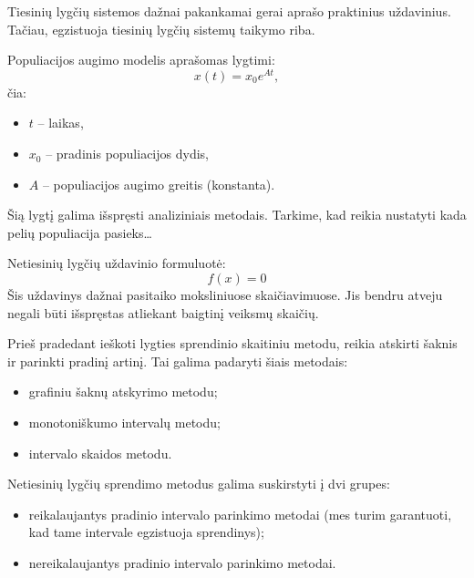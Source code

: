 
\cite[16-18]{textbook}

Tiesinių lygčių sistemos dažnai pakankamai gerai aprašo praktinius
uždavinius. Tačiau, egzistuoja tiesinių lygčių sistemų taikymo
riba.

\begin{exmp}
  Populiacijos augimo modelis aprašomas lygtimi:
  \begin{equation*}
    x(t) = x_{0}e^{At},
  \end{equation*}
  čia:
  \begin{itemize}
    \item $t$ – laikas,
    \item $x_{0}$ – pradinis populiacijos dydis,
    \item $A$ – populiacijos augimo greitis (konstanta).
  \end{itemize}

  Šią lygtį galima išspręsti analiziniais metodais. Tarkime, kad reikia
  nustatyti kada pelių populiacija pasieks…
\end{exmp}

Netiesinių lygčių uždavinio formuluotė:
\begin{equation*}
  f(x) = 0
\end{equation*}
Šis uždavinys dažnai pasitaiko moksliniuose skaičiavimuose. Jis bendru
atveju negali būti išspręstas atliekant baigtinį veiksmų skaičių.


Prieš pradedant ieškoti lygties sprendinio skaitiniu metodu, reikia
atskirti šaknis ir parinkti pradinį artinį. Tai galima padaryti šiais
metodais:
\begin{itemize}
  \item grafiniu šaknų atskyrimo metodu;
  \item monotoniškumo intervalų metodu;
  \item intervalo skaidos metodu.
\end{itemize}

Netiesinių lygčių sprendimo metodus galima suskirstyti į dvi grupes:
\begin{itemize}
  \item reikalaujantys pradinio intervalo parinkimo metodai (mes turim
    garantuoti, kad tame intervale egzistuoja sprendinys);
  \item nereikalaujantys pradinio intervalo parinkimo metodai.
\end{itemize}

